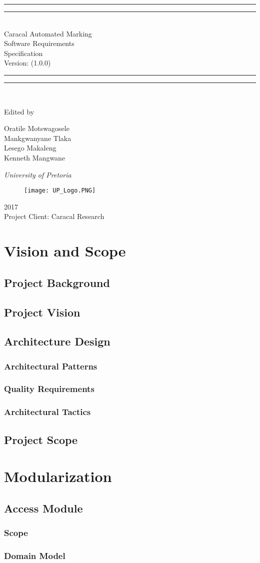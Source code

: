 \documentclass{article}
\newcommand*{\titleGP}{\begingroup %
\centering %
\vspace*{\baselineskip} %

\rule{\textwidth}{1.6pt}\vspace*{-\baselineskip}\vspace*{2pt} %
\rule{\textwidth}{0.4pt}\\[\baselineskip] %

{\LARGE Caracal Automated Marking \\ Software Requirements \\ Specification}\\[0.2\baselineskip]  %

Version: (1.0.0) 


\rule{\textwidth}{0.4pt}\vspace*{-\baselineskip}\vspace{3.2pt} %
\rule{\textwidth}{1.6pt}\\[\baselineskip] %

\scshape %
\vspace*{2\baselineskip} %

Edited by \\[\baselineskip]
{\Large Oratile Motswagosele \\ Mankgwanyane Tlaka \\ Lesego Makaleng \\ Kenneth Mangwane \par} %

{\itshape University of Pretoria\par} %

\begin{figure}[t]
\centering
	\texttt{[image: UP\_Logo.PNG]}
\end{figure}

{\scshape 2017} \\[0.3\baselineskip] %
{ Project Client: Caracal Research}\par %

\endgroup}
\begin{document}
\titleGP %
\pagebreak

\clearpage
\tableofcontents
\clearpage

\section{Vision and Scope}
	\subsection{Project Background}
	
	\subsection{Project Vision}
	
	\subsection{Architecture Design}
		\subsubsection{Architectural Patterns}
		\subsubsection{Quality Requirements}
		\subsubsection{Architectural Tactics}
	
	\subsection{Project Scope}
	
\section{Modularization}
	\subsection{Access Module}
		\subsubsection{Scope}
		\subsubsection{Domain Model}
\end{document}
